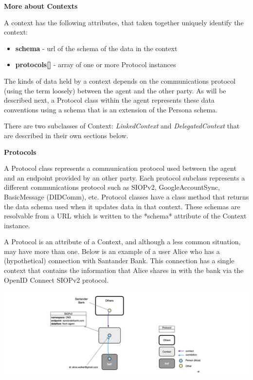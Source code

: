 \documentclass[11pt, oneside]{article}   	%
\begin{document}
\textbf{More about Contexts}

A context has the following attributes, that taken together uniquely identify the context:

\begin{itemize}
\item \textbf{schema} - url of the schema of the data in the context
\item \textbf{protocols[]} - array of one or more Protocol instances
\end{itemize}

The kinds of data held by a context depends on the communications protocol (using the term loosely) between the agent and the other party. As will be described next, a Protocol class within the agent represents these data conventions using a schema that is an extension of the Persona schema.

There are two subclasses of Context: \emph{LinkedContext} and \emph{DelegatedContext} that are described in their own sections below.

\textbf{Protocols}

A Protocol class represents a communication protocol used between the agent and an endpoint provided by an other party. Each protocol subclass represents a different communications protocol such as SIOPv2, GoogleAccountSync, BasicMessage (DIDComm), etc.  Protocol classes have a class method that returns the data schema used when it updates data in that context. These schemas are resolvable from a URL which is written to the *schema* attribute of the Context instance.

A Protocol is an attribute of a Context, and although a less common situation, may have more than one. Below is an example of a user Alice who has a (hypothetical) connection with Santander Bank. This connection has a single context that contains the information that Alice shares in with the bank via the OpenID Connect SIOPv2 protocol.

\includegraphics[width=\textwidth]{./images/context-with-protocol.png}
\end{document}
